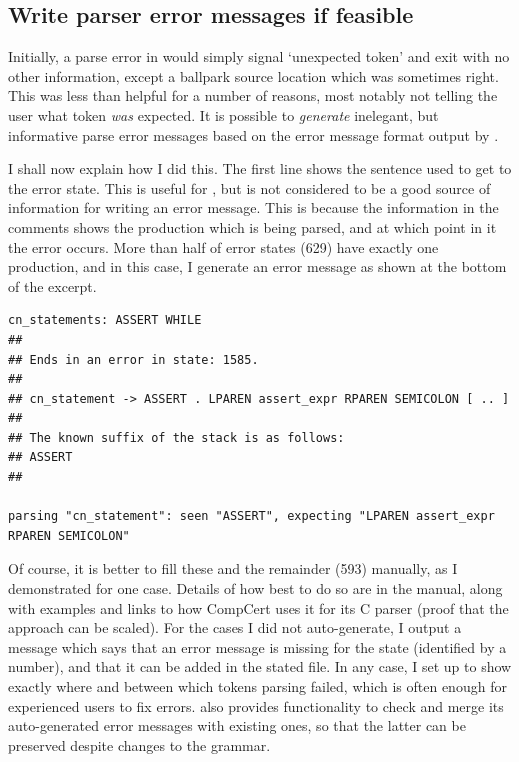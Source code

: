 \subsection{Write parser error messages if feasible}

Initially, a parse error in  would simply signal `unexpected token' and
exit with no other information, except a ballpark source location which was
sometimes right. This was less than helpful for a number of reasons, most
notably not telling the user what token \emph{was} expected. It is possible to
\emph{generate} inelegant, but informative parse error messages based on
the error message format output by
.

I shall now explain how I did
this. The first line shows the sentence used to get to the error state.
This is useful for , but is not considered to be a good source of
information for writing an error message. This is because the information in
the comments shows the production which is being parsed, and at which point in
it the error occurs. More than half of error states (629) have exactly one
production, and in this case, I generate an error message as shown at the
bottom of the excerpt.

\begin{verbatim}
cn_statements: ASSERT WHILE
##
## Ends in an error in state: 1585.
##
## cn_statement -> ASSERT . LPAREN assert_expr RPAREN SEMICOLON [ .. ]
##
## The known suffix of the stack is as follows:
## ASSERT
##

parsing "cn_statement": seen "ASSERT", expecting "LPAREN assert_expr RPAREN SEMICOLON"
\end{verbatim}

Of course, it is better to fill these and the remainder (593) manually, as I
demonstrated for one
case.
Details of how best to do so are in the  manual, along with
examples and links to how CompCert uses it for its C parser (proof that
the approach can be scaled). For the cases I did not auto-generate, I
output a message which says that an error message is missing for the state
(identified by a number), and that it can be added in the stated file. In any
case, I set up  to show exactly where and between which tokens
parsing failed, which is often enough for experienced users to fix errors.
 also provides functionality to check and merge its auto-generated
error messages with existing ones, so that the latter can be preserved despite
changes to the grammar.

